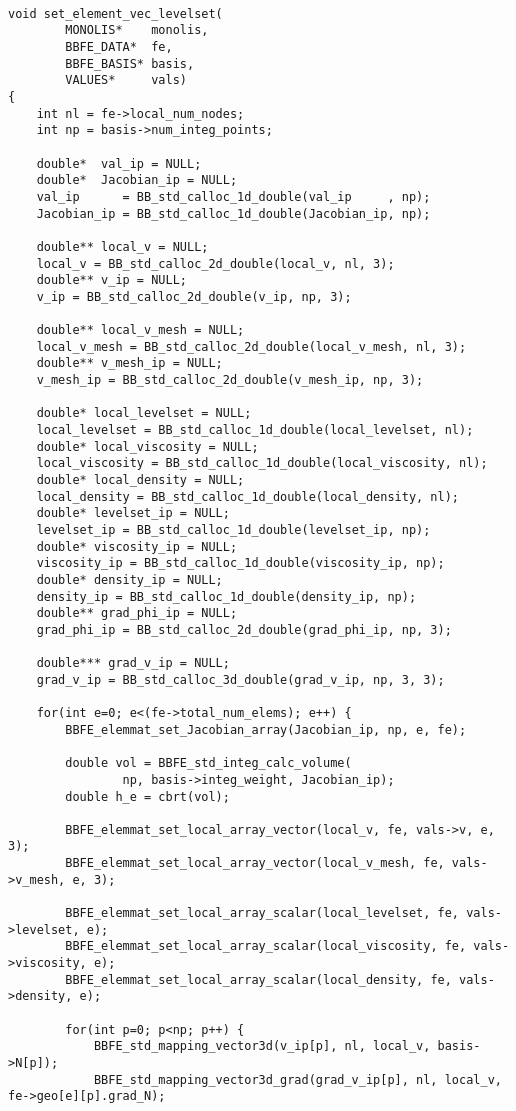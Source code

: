 \begin{lstlisting}[caption = mlflow\_fs.cの中のレベルセット関数の右辺ベクトルを計算する関数]

void set_element_vec_levelset(
		MONOLIS*	monolis,
		BBFE_DATA*	fe,
		BBFE_BASIS* basis,
		VALUES*		vals)
{
	int nl = fe->local_num_nodes;
	int np = basis->num_integ_points;

	double*  val_ip = NULL;
	double*  Jacobian_ip = NULL;
	val_ip      = BB_std_calloc_1d_double(val_ip     , np);
	Jacobian_ip = BB_std_calloc_1d_double(Jacobian_ip, np);

	double** local_v = NULL;
	local_v = BB_std_calloc_2d_double(local_v, nl, 3);
	double** v_ip = NULL; 
	v_ip = BB_std_calloc_2d_double(v_ip, np, 3);

	double** local_v_mesh = NULL;
	local_v_mesh = BB_std_calloc_2d_double(local_v_mesh, nl, 3);
	double** v_mesh_ip = NULL; 
	v_mesh_ip = BB_std_calloc_2d_double(v_mesh_ip, np, 3);

	double* local_levelset = NULL;
	local_levelset = BB_std_calloc_1d_double(local_levelset, nl);
	double* local_viscosity = NULL;
	local_viscosity = BB_std_calloc_1d_double(local_viscosity, nl);
	double* local_density = NULL;
	local_density = BB_std_calloc_1d_double(local_density, nl);
	double* levelset_ip = NULL;
	levelset_ip = BB_std_calloc_1d_double(levelset_ip, np);
	double* viscosity_ip = NULL;
	viscosity_ip = BB_std_calloc_1d_double(viscosity_ip, np);
	double* density_ip = NULL;
	density_ip = BB_std_calloc_1d_double(density_ip, np);
	double** grad_phi_ip = NULL;
	grad_phi_ip = BB_std_calloc_2d_double(grad_phi_ip, np, 3);

	double*** grad_v_ip = NULL;
	grad_v_ip = BB_std_calloc_3d_double(grad_v_ip, np, 3, 3);

	for(int e=0; e<(fe->total_num_elems); e++) {
		BBFE_elemmat_set_Jacobian_array(Jacobian_ip, np, e, fe);

		double vol = BBFE_std_integ_calc_volume(
				np, basis->integ_weight, Jacobian_ip);
		double h_e = cbrt(vol);

		BBFE_elemmat_set_local_array_vector(local_v, fe, vals->v, e, 3);
		BBFE_elemmat_set_local_array_vector(local_v_mesh, fe, vals->v_mesh, e, 3);
		
		BBFE_elemmat_set_local_array_scalar(local_levelset, fe, vals->levelset, e);
		BBFE_elemmat_set_local_array_scalar(local_viscosity, fe, vals->viscosity, e);
		BBFE_elemmat_set_local_array_scalar(local_density, fe, vals->density, e);

		for(int p=0; p<np; p++) {
			BBFE_std_mapping_vector3d(v_ip[p], nl, local_v, basis->N[p]);
			BBFE_std_mapping_vector3d_grad(grad_v_ip[p], nl, local_v, fe->geo[e][p].grad_N);


\end{lstlisting}
